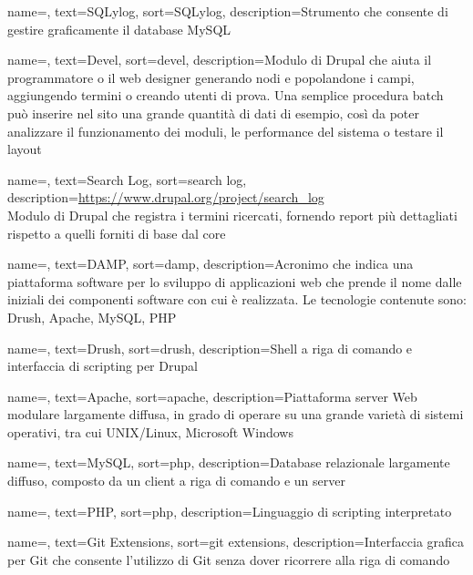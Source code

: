 {
	name=,
	text=SQLylog,
	sort=SQLylog,
	description={Strumento che consente di gestire graficamente il database MySQL}
}

{
	name=,
	text=Devel,
	sort=devel,
	description={Modulo di \gls{Drupal} che aiuta il programmatore o il web designer generando nodi e popolandone i campi, aggiungendo termini o creando utenti di prova. Una semplice procedura batch può inserire nel sito una grande quantità di dati di esempio, così da poter analizzare il funzionamento dei moduli, le performance del sistema o testare il layout}
}

{
	name=,
	text=Search Log,
	sort=search log,
	description={\url{https://www.drupal.org/project/search_log} \\
		Modulo di Drupal che registra i termini ricercati, fornendo report più dettagliati rispetto a quelli forniti di base dal core}
}

{
	name=,
	text=DAMP,
	sort=damp,
	description={Acronimo che indica una piattaforma software per lo sviluppo di applicazioni web che prende il nome dalle iniziali dei componenti software con cui è realizzata. Le tecnologie contenute sono: \gls{Drush}, \gls{Apache}, \gls{MySQL}, \gls{PHP}}
}

{
	name=,
	text=Drush,
	sort=drush,
	description={Shell a riga di comando e interfaccia di scripting per \gls{Drupal}}
}

{
	name=,
	text=Apache,
	sort=apache,
	description={Piattaforma server Web modulare largamente diffusa, in grado di operare su una grande varietà di sistemi operativi, tra cui UNIX/Linux, Microsoft Windows}
}

{
	name=,
	text=MySQL,
	sort=php,
	description={Database relazionale largamente diffuso, composto da un client a riga di comando e un server}
}

{
	name=,
	text=PHP,
	sort=php,
	description={Linguaggio di scripting interpretato}
}

{
	name=,
	text=Git Extensions,
	sort=git extensions,
	description={Interfaccia grafica per \gls{Git} che consente l'utilizzo di \gls{Git} senza dover ricorrere alla riga di comando}
}

